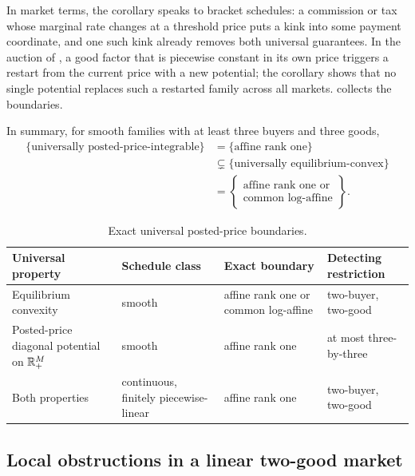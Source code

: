 In market terms, the corollary speaks to bracket schedules: a commission or tax whose marginal rate changes at a threshold price puts a kink into some payment coordinate, and one such kink already removes both universal guarantees. In the auction of \citet{okisato2026}, a good factor that is piecewise constant in its own price triggers a restart from the current price with a new potential; the corollary shows that no single potential replaces such a restarted family across all markets.  collects the boundaries.

In summary, for smooth families with at least three buyers and three goods,
\[
\begin{aligned}
\{\text{universally posted-price-integrable}\}
&=\{\text{affine rank one}\}\\
&\subsetneq
\{\text{universally equilibrium-convex}\}\\
&=\left\{\substack{\text{affine rank one or}\\
\text{common log-affine}}\right\}.
\end{aligned}
\]

\begin{table}[!t]
\centering
\caption{Exact universal posted-price boundaries.}
\label{tab:results-summary}
\small
\setlength{\tabcolsep}{4pt}
\begin{tabular}{@{}>{\raggedright\arraybackslash}p{}>{\raggedright\arraybackslash}p{}>{\raggedright\arraybackslash}p{}>{\raggedright\arraybackslash}p{}@{}}
\toprule
Universal property & Schedule class & Exact boundary & Detecting restriction \\
\midrule
Equilibrium convexity & smooth & affine rank one or common log-affine & two-buyer, two-good \\
Posted-price diagonal potential on $\mathbb{R}_+^M$ & smooth & affine rank one & at most three-by-three \\
Both properties & continuous, finitely piecewise-linear & affine rank one & two-buyer, two-good \\
\bottomrule
\end{tabular}
\end{table}

\subsection{Local obstructions in a linear two-good market}\label{subsec:path-relaxations}

